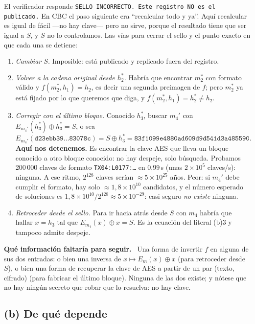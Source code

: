 \documentclass[11pt,letterpaper]{article}
\newcommand{\xor}{\oplus}
\newcommand{\paso}[1]{\par\smallskip\noindent\textbf{#1.}\ }
\begin{document}
El verificador responde \texttt{SELLO INCORRECTO. Este registro NO es el publicado.}
En CBC el paso siguiente era ``recalcular todo y ya''. Aquí recalcular es igual de fácil
---no hay clave--- pero no sirve, porque el resultado tiene que ser igual a $S$, y $S$ no lo controlamos.
Las vías para cerrar el sello y el punto exacto en que cada una se detiene:

\begin{enumerate}[itemsep=3pt]
  \item \emph{Cambiar $S$.} Imposible: está publicado y replicado fuera del registro.
  \item \emph{Volver a la cadena original desde $h_2^*$.} Habría que encontrar $m_2^*$ con formato válido y
        $f(m_2^*,h_1)=h_2$, es decir una segunda preimagen de $f$; pero $m_2^*$ ya está fijado por lo que
        queremos que diga, y $f(m_2^*,h_1)=h_2^*\neq h_2$.
  \item \emph{Corregir con el último bloque.} Conocido $h_3^*$, buscar $m_4'$ con $E_{m_4'}(h_3^*)\xor h_3^* = S$, o sea
        \[
          E_{m_4'}(\texttt{d23ebb39\ldots83078c}) = S\xor h_3^* = \texttt{83f1099e4880ad609d9d541d3a485590}.
        \]
        \textbf{Aquí nos detenemos.} Es encontrar la clave AES que lleva un bloque conocido a otro bloque conocido:
        no hay despeje, solo búsqueda. Probamos 200\,000 claves de formato \texttt{TX04:L0177:\ldots} en 0,99\,s
        (unas $2\times10^5$ claves/s): ninguna. A ese ritmo, $2^{128}$ claves serían $\approx 5\times 10^{25}$ años.
        Peor: si $m_4'$ debe cumplir el formato, hay solo $\approx 1{,}8\times10^{10}$ candidatos, y el número esperado
        de soluciones es $1{,}8\times10^{10}/2^{128}\approx 5\times10^{-29}$: casi seguro \emph{no existe} ninguna.
  \item \emph{Retroceder desde el sello.} Para ir hacia atrás desde $S$ con $m_4$ habría que hallar $x=h_3$ tal que
        $E_{m_4}(x)\xor x = S$. Es la ecuación del literal (b)3 y tampoco admite despeje.
\end{enumerate}

\paso{Qué información faltaría para seguir}
Una forma de invertir $f$ en alguna de sus dos entradas: o bien una inversa de $x\mapsto E_m(x)\xor x$
(para retroceder desde $S$), o bien una forma de recuperar la clave de AES a partir de un par
(texto, cifrado) (para fabricar el último bloque). Ninguna de las dos existe; y nótese que no hay ningún
secreto que robar que lo resuelva: no hay clave.

\subsection*{(b) De qué depende}
\end{document}
